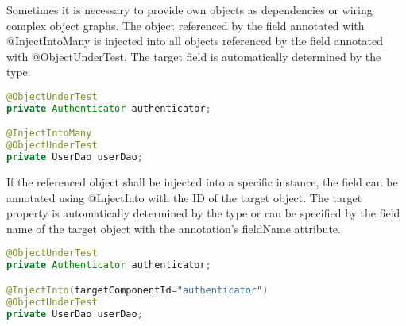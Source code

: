 Sometimes it is necessary to provide own objects as dependencies or wiring complex object graphs.
The object referenced by the field annotated with @InjectIntoMany is injected into all objects referenced by the field annotated with @ObjectUnderTest.
The target field is automatically determined by the type.

\begin{lstlisting}[language={JAVA},caption=InjectIntoMany]
@ObjectUnderTest
private Authenticator authenticator;

@InjectIntoMany
@ObjectUnderTest
private UserDao userDao;
\end{lstlisting}

If the referenced object shall be injected into a specific instance, the field can be annotated using @InjectInto with the ID of the target object.
The target property is automatically determined by the type or can be specified by the field name of the target object with the annotation's fieldName attribute.

\begin{lstlisting}[language={JAVA},caption=InjectInto]
@ObjectUnderTest
private Authenticator authenticator;

@InjectInto(targetComponentId="authenticator")
@ObjectUnderTest
private UserDao userDao;
\end{lstlisting}





